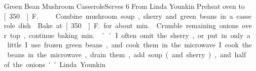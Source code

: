 \begin{recipe}{Green Bean Mushroom Casserole}{Serves 6}{}
\freeform From Linda Younkin
\newstep Preheat oven to \unit[350\0]{F.}
Combine mushroom soup, sherry and green beans in a casserole dish.
\newstep Bake at \unit[350\0]{F.} for about \unit[25]{min.}
Crumble remaining onions over top, continue baking \unit[5]{min.}
\freeform ``I often omit the sherry, or put in only a little. I use frozen green beans, and cook them in the microwave.  I cook the beans in the microwave, drain them, add soup (and sherry), and half of the onions.'' Linda Younkin

\end{recipe}
